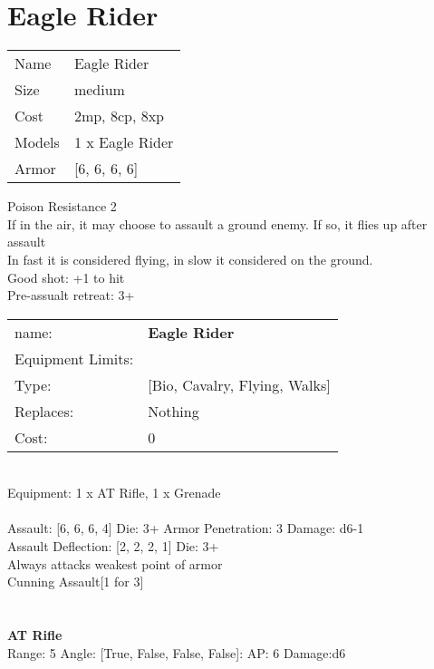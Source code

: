 \pagebreak\pagebreak

\section{ Eagle Rider }

\begin{tabular}{ll}
  Name & Eagle Rider \\
  Size & medium\\
  Cost & 2mp, 8cp, 8xp\\
  Models & 1 x Eagle Rider\\
  Armor & [6, 6, 6, 6]\\
\end{tabular}

\noindent Poison Resistance 2\\ 
If in the air, it may choose to assault a ground enemy. If so, it flies up after assault\\ 
In fast it is considered flying, in slow it considered on the ground.\\ 
Good shot: +1 to hit\\ 
Pre-assualt retreat: 3+\\ 


\noindent
\begin{tabular}{ll}
name: &{\bf Eagle Rider } \\
Equipment Limits: & \\
Type: &[Bio, Cavalry, Flying, Walks] \\
Replaces: &Nothing \\
Cost: & 0\\
\end{tabular}
\ \\
Equipment: 1 x AT Rifle, 1 x Grenade \\
\ \\
Assault: [6, 6, 6, 4] Die: 3+ Armor Penetration: 3 Damage: d6-1 \\
Assault Deflection: [2, 2, 2, 1] Die: 3+\\
\indent Always attacks weakest point of armor\\ 
Cunning Assault[1 for 3]\\ 
 
\ \\

\ \\
{\bf AT Rifle } \\



Range: 5  Angle: [True, False, False, False]: AP: 6 Damage:d6 \\




